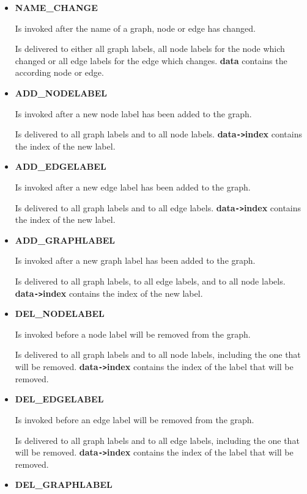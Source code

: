 \begin{itemize}
\begin{itemize}
\item{\bf NAME\_CHANGE}
  
  Is invoked after the name of a graph, node or edge has changed.
  
  Is delivered to either all graph labels, all node labels for
  the node which changed or all edge labels for the edge which
  changes. {\bf data} contains the according node or edge.

\item{\bf ADD\_NODELABEL}
  
  Is invoked after a new node label has been added to the graph.
  
  Is delivered to all graph labels and to all node labels.  {\bf
    data\verb|->|index} contains the index of the new label.

\item{\bf ADD\_EDGELABEL}
  
  Is invoked after a new edge label has been added to the graph.
  
  Is delivered to all graph labels and to all edge labels.  {\bf
    data\verb|->|index} contains the index of the new label.

\item{\bf ADD\_GRAPHLABEL}
  
  Is invoked after a new graph label has been added to the graph.
  
  Is delivered to all graph labels, to all edge labels, and to all
  node labels.  {\bf data\verb|->|index} contains the index of
  the new label.

\item{\bf DEL\_NODELABEL}
  
  Is invoked before a node label will be removed from the graph.
  
  Is delivered to all graph labels and to all node labels,
  including the one that will be removed.  {\bf
    data\verb|->|index} contains the index of the label that will
  be removed.

\item{\bf DEL\_EDGELABEL}
  
  Is invoked before an edge label will be removed from the graph.
  
  Is delivered to all graph labels and to all edge labels,
  including the one that will be removed.  {\bf
    data\verb|->|index} contains the index of the label that will
  be removed.

\item{\bf DEL\_GRAPHLABEL}
  

\end{itemize}
\end{itemize}
